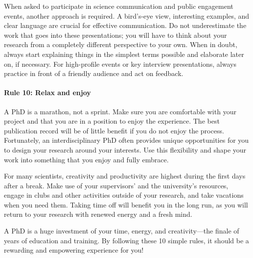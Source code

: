 \documentclass[12pt]{report}
\begin{document}
When asked to participate in science communication and public engagement events, another approach is required. A bird’s-eye view, interesting examples, and clear language are crucial for effective communication. Do not underestimate the work that goes into these presentations; you will have to think about your research from a completely different perspective to your own. When in doubt, always start explaining things in the simplest terms possible and elaborate later on, if necessary. For high-profile events or key interview presentations, always practice in front of a friendly audience and act on feedback.

\paragraph{Rule 10: Relax and enjoy}

A PhD is a marathon, not a sprint. Make sure you are comfortable with your project and that you are in a position to enjoy the experience. The best publication record will be of little benefit if you do not enjoy the process. Fortunately, an interdisciplinary PhD often provides unique opportunities for you to design your research around your interests. Use this flexibility and shape your work into something that you enjoy and fully embrace.

For many scientists, creativity and productivity are highest during the first days after a break. Make use of your supervisors’ and the university’s resources, engage in clubs and other activities outside of your research, and take vacations when you need them. Taking time off will benefit you in the long run, as you will return to your research with renewed energy and a fresh mind.

A PhD is a huge investment of your time, energy, and creativity—the finale of years of education and training. By following these 10 simple rules, it should be a rewarding and empowering experience for you!
\end{document}
